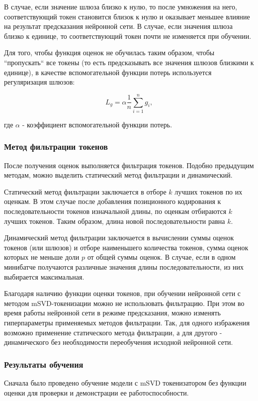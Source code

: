 В случае, если значение шлюза близко к нулю, то после умножения на него, соответствующий токен становится близок к нулю и оказывает меньшее влияние на результат предсказания нейронной сети. В случае, если значения шлюза близко к единице, то соответствующий токен почти не изменяется при обучении.

Для того, чтобы функция оценок не обучилась таким образом, чтобы ``пропускать`` все токены (то есть предсказывать все значения шлюзов близкими к единице), в качестве вспомогательной функции потерь используется регуляризация шлюзов:

$$
L_g = \alpha \dfrac{1}{n}\sum_{i=1}^n g_i,
$$

где $\alpha$ - коэффициент вспомогательной функции потерь.

\subsubsection{Метод фильтрации токенов}
После получения оценок выполняется фильтрация токенов. Подобно предыдущим методам, можно выделить статический метод фильтрации и динамический.

Статический метод фильтрации заключается в отборе $k$ лучших токенов по их оценкам. В этом случае после добавления позиционного кодирования к последовательности токенов изначальной длины, по оценкам отбираются $k$ лучших токенов. Таким образом, длина новой последовательности равна $k$.

Динамический метод фильтрации заключается в вычислении суммы оценок токенов (или шлюзов) и отборе наименьшего количества токенов, сумма оценок которых не меньше доли $p$ от общей суммы оценок. В случае, если в одном минибатче получаются различные значения длины последовательности, из них выбирается максимальная.

Благодаря наличию функции оценки токенов, при обучении нейронной сети с методом mSVD-токенизации можно не использовать фильтрацию. При этом во время работы нейронной сети в режиме предсказания, можно изменять гиперпараметры применяемых методов фильтрации. Так, для одного избражения возможно применение статического метода фильтрации, а для другого - динамического без необходимости переобучения исходной нейронной сети.


\subsubsection{Результаты обучения}

Сначала было проведено обучение модели с mSVD токенизатором без функции оценки для проверки и демонстрации ее работоспособности.


